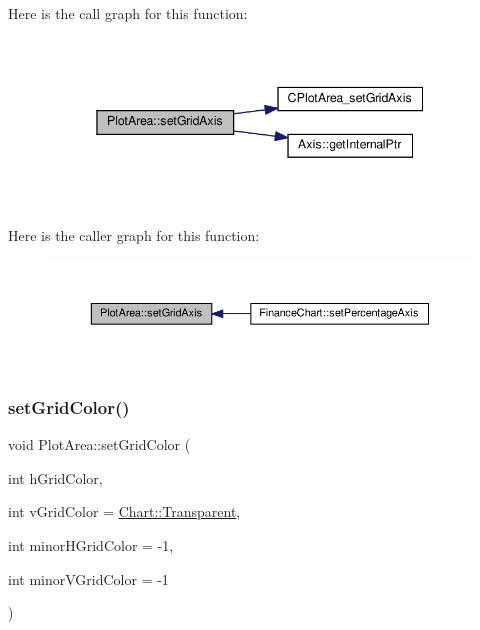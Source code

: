 Here is the call graph for this function\+:
\nopagebreak
\begin{figure}[H]
\begin{center}
\leavevmode
\includegraphics[width=345pt]{class_plot_area_a4331047ed4ae116093d50c0a69e6bd91_cgraph}
\end{center}
\end{figure}
Here is the caller graph for this function\+:
\nopagebreak
\begin{figure}[H]
\begin{center}
\leavevmode
\includegraphics[width=350pt]{class_plot_area_a4331047ed4ae116093d50c0a69e6bd91_icgraph}
\end{center}
\end{figure}
\mbox{\label{class_plot_area_a5f02a40eeaf5fbde3332d5c6188f4556}} 
\subsubsection{\texorpdfstring{set\+Grid\+Color()}{setGridColor()}}
{\footnotesize\ttfamily void Plot\+Area\+::set\+Grid\+Color (\begin{DoxyParamCaption}\item[{int}]{h\+Grid\+Color,  }\item[{int}]{v\+Grid\+Color = {\ttfamily \hyperlink{namespace_chart_abee0d882fdc9ad0b001245ad9fc64011afc6811800a9e2582dac0157b6279f836}{Chart\+::\+Transparent}},  }\item[{int}]{minor\+H\+Grid\+Color = {\ttfamily -\/1},  }\item[{int}]{minor\+V\+Grid\+Color = {\ttfamily -\/1} }\end{DoxyParamCaption})\hspace{0.3cm}{\ttfamily [inline]}}



